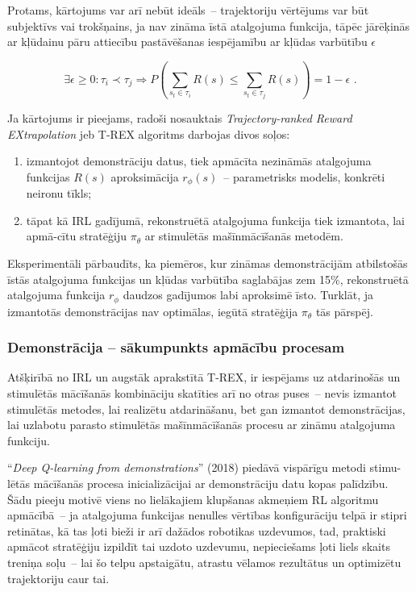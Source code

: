 \documentclass[12pt, a4paper]{article}
\numberwithin{equation}{section} %
\begin{document}
Protams, kārtojums var arī nebūt ideāls~-- trajektoriju vērtējums var būt subjektīvs vai trokšņains, ja nav zināma īstā atalgojuma funkcija, tāpēc jārēķinās ar kļūdainu pāru attiecību pastāvēšanas iespējamību ar kļūdas varbūtību $\epsilon$

\begin{equation}
    \exists \epsilon \geq 0 : \tau_i \prec \tau_j \Rightarrow P\left(\sum_{s_t \in \tau_i}R(s) \leq \sum_{s_t \in \tau_j}R(s)\right) = 1 - \epsilon
\text{ .}
\end{equation}

Ja kārtojums ir pieejams, radoši nosauktais \textit{Trajectory-ranked Reward EXtrapolation} jeb T-REX algoritms darbojas divos soļos:

\begin{enumerate}
    \item izmantojot demonstrāciju datus, tiek apmācīta nezināmās atalgojuma funkcijas $R(s)$ aproksimācija $r_{\phi}(s)$~-- parametrisks modelis, konkrēti neironu tīkls;
    \item tāpat kā IRL gadījumā, rekonstruētā atalgojuma funkcija tiek izmantota, lai apmā-cītu stratēģiju $\pi_{\theta}$ ar stimulētās mašīnmācīšanās metodēm.
\end{enumerate}

Eksperimentāli pārbaudīts, ka piemēros, kur zināmas demonstrācijām atbilstošās īstās atalgojuma funkcijas un kļūdas varbūtība saglabājas zem 15\%, rekonstruētā atalgojuma funkcija $r_{\phi}$ daudzos gadījumos labi aproksimē īsto. Turklāt, ja izmantotās demonstrācijas nav optimālas, iegūtā stratēģija $\pi_{\theta}$ tās pārspēj.

\subsubsection{Demonstrācija -- sākumpunkts apmācību procesam}

Atšķirībā no IRL un augstāk aprakstītā T-REX, ir iespējams uz atdarinošās un stimulētās mācīšanās kombināciju skatīties arī no otras puses~-- nevis izmantot stimulētās metodes, lai realizētu atdarināšanu, bet gan izmantot demonstrācijas, lai uzlabotu parasto stimulētās mašīnmācīšanās procesu ar zināmu atalgojuma funkciju.

``\textit{Deep Q-learning from demonstrations}'' \cite{hester2018deep} (2018) piedāvā vispārīgu metodi stimu-lētās mācīšanās procesa inicializācijai ar demonstrāciju datu kopas palīdzību. Šādu pieeju motivē viens no lielākajiem klupšanas akmeņiem RL algoritmu apmācībā~-- ja atalgojuma funkcijas nenulles vērtības konfigurāciju telpā ir stipri retinātas, kā tas ļoti bieži ir arī dažādos robotikas uzdevumos, tad, praktiski apmācot stratēģiju izpildīt tai uzdoto uzdevumu, nepieciešams ļoti liels skaits treniņa soļu~-- lai šo telpu apstaigātu, atrastu vēlamos rezultātus un optimizētu trajektoriju caur tai.
\end{document}
